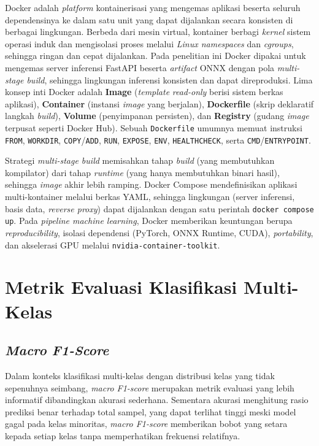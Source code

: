 Docker \citep{merkelDocker2014} adalah \textit{platform} kontainerisasi yang mengemas aplikasi beserta seluruh dependensinya ke dalam satu unit yang dapat dijalankan secara konsisten di berbagai lingkungan. Berbeda dari mesin virtual, kontainer berbagi \textit{kernel} sistem operasi induk dan mengisolasi proses melalui \textit{Linux namespaces} dan \textit{cgroups}, sehingga ringan dan cepat dijalankan. Pada penelitian ini Docker dipakai untuk mengemas server inferensi FastAPI beserta \textit{artifact} ONNX dengan pola \textit{multi-stage build}, sehingga lingkungan inferensi konsisten dan dapat direproduksi. Lima konsep inti Docker adalah \textbf{Image} (\textit{template} \textit{read-only} berisi sistem berkas aplikasi), \textbf{Container} (instansi \textit{image} yang berjalan), \textbf{Dockerfile} (skrip deklaratif langkah \textit{build}), \textbf{Volume} (penyimpanan persisten), dan \textbf{Registry} (gudang \textit{image} terpusat seperti Docker Hub). Sebuah \texttt{Dockerfile} umumnya memuat instruksi \texttt{FROM}, \texttt{WORKDIR}, \texttt{COPY}/\texttt{ADD}, \texttt{RUN}, \texttt{EXPOSE}, \texttt{ENV}, \texttt{HEALTHCHECK}, serta \texttt{CMD}/\texttt{ENTRYPOINT}.

Strategi \textit{multi-stage build} memisahkan tahap \textit{build} (yang membutuhkan kompilator) dari tahap \textit{runtime} (yang hanya membutuhkan binari hasil), sehingga \textit{image} akhir lebih ramping. Docker Compose mendefinisikan aplikasi multi-kontainer melalui berkas YAML, sehingga lingkungan (server inferensi, basis data, \textit{reverse proxy}) dapat dijalankan dengan satu perintah \texttt{docker compose up}. Pada \textit{pipeline machine learning}, Docker memberikan keuntungan berupa \textit{reproducibility}, isolasi dependensi (PyTorch, ONNX Runtime, CUDA), \textit{portability}, dan akselerasi GPU melalui \texttt{nvidia-container-toolkit}.

\section{Metrik Evaluasi Klasifikasi Multi-Kelas}
\label{sec:metrics}

\subsection{\textit{Macro F1-Score}}

Dalam konteks klasifikasi multi-kelas dengan distribusi kelas yang tidak sepenuhnya seimbang, \textit{macro F1-score} merupakan metrik evaluasi yang lebih informatif dibandingkan akurasi sederhana. Sementara akurasi menghitung rasio prediksi benar terhadap total sampel, yang dapat terlihat tinggi meski model gagal pada kelas minoritas, \textit{macro F1-score} memberikan bobot yang setara kepada setiap kelas tanpa memperhatikan frekuensi relatifnya.

